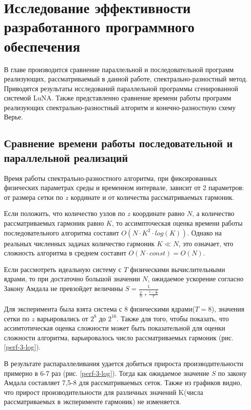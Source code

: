 \section{Исследование эффективности разработанного программного обеспечения}

В главе производится сравнение параллельной и последовательной программ реализующих,
рассматриваемый в данной работе, спектрально-разностный метод.
Приводятся результаты исследований параллельной программы сгенированной системой LuNA.
Также представленно сравнение времени работы программ реализующих спектрально-разностный алгоритм
и конечно-разностную схему Верье.

\subsection{Сравнение времени работы последовательной и параллельной реализаций}

Время работы спектрально-разностного алгоритма, при фиксированных физических параметрах среды и временном интервале,
зависит от 2 параметров: от размера сетки по $z$ кординате и от количества рассматриваемых гармоник.

Если положить, что количество узлов по $z$ координате равно $N$, а количество рассматриваемых гармоник равно $K$,
то ассимпточеская оценка времени работы последовательного алгоритма составит $O(N\cdot K^2 \cdot log(K))$. Однако на реальных численных задачах
количество гармоник $K \ll N$, это означает, что сложность алгоритма в среднем составит $O(N \cdot const)=O(N)$.

Если рассмотреть идеальную систему с $T$ физическими вычислительными ядрами, то при достаточно большой значении $N$,
ожидаемое ускорение согласно Закону Амдала не превзойдет величины $S = \frac{1}{\frac{T}{N} + \frac{1-\frac{T}{N}}{T}}$

Для эксперимента была взята система с 8 физическими ядрами($T=8$), значения сетки по $z$ варьировались от $2^8$ до $2^{16}$.
Также для того, чтобы показать, что ассимтотическая оценка сложности может быть показательной для оценки сложности алгоритма,
варьировалось число рассматриваемых гармоник (рис. \ref{perf-3-log}).


В результате распараллеливания удается добиться прироста производительности примерно в 6-7 раз (рис. \ref{perf-3-log}). Тогда как
ожидаемое значение $S$ по закону Амдала составляет 7,5-8 для рассматриваемых сеток. Также из графиков видно, что прирост
производительности для различных значений K(числа рассматриваемых в эксперименте гармоник) не изменяется.

